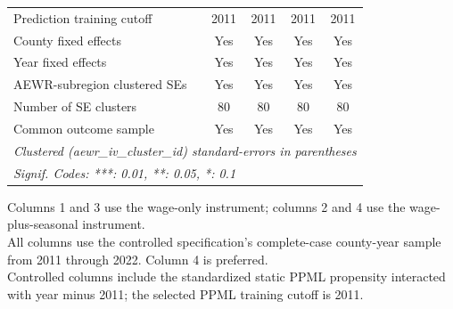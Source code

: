 \begin{table}[htbp]
\begin{tabular}{lcccc}
      Prediction training cutoff           & 2011          & 2011                  & 2011                 & 2011\\  
      County fixed effects                 & Yes           & Yes                   & Yes                  & Yes\\  
      Year fixed effects                   & Yes           & Yes                   & Yes                  & Yes\\  
      AEWR-subregion clustered SEs         & Yes           & Yes                   & Yes                  & Yes\\  
      Number of SE clusters                & 80            & 80                    & 80                   & 80\\  
      Common outcome sample                & Yes           & Yes                   & Yes                  & Yes\\  
      \midrule \midrule
      \multicolumn{5}{l}{\emph{Clustered (aewr\_iv\_cluster\_id) standard-errors in parentheses}}\\
      \multicolumn{5}{l}{\emph{Signif. Codes: ***: 0.01, **: 0.05, *: 0.1}}\\
   \end{tabular}
   
   \par \raggedright 
   Columns 1 and 3 use the wage-only instrument; columns 2 and 4 use the wage-plus-seasonal instrument.\\
   All columns use the controlled specification's complete-case county-year sample from 2011 through 2022. Column 4 is preferred.\\
   Controlled columns include the standardized static PPML propensity interacted with year minus 2011; the selected PPML training cutoff is 2011.
\end{table}


